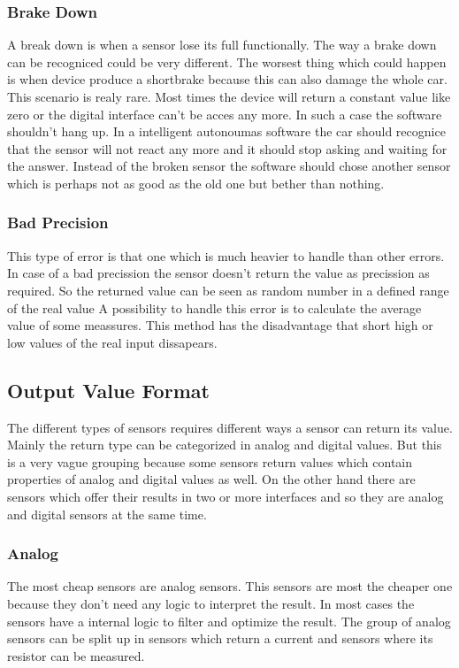 \subsubsection{Brake Down}
A break down is when a sensor lose its full functionally.
The way a brake down can be recogniced could be very different.
The worsest thing which could happen is when device produce a shortbrake because this can also damage the whole car.
This scenario is realy rare.
Most times the device will return a constant value like zero or the digital interface can't be acces any more.
In such a case the software shouldn't hang up.
In a intelligent autonoumas software the car should recognice that the sensor will not react any more and it should stop asking and waiting for the answer.
Instead of the broken sensor the software should chose another sensor which is perhaps not as good as the old one but bether than nothing.


\subsubsection{Bad Precision}
This type of error is that one which is much heavier to handle than other errors.
In case of a bad precission the sensor doesn't return the value as precission as required.
So the returned value can be seen as random number in a defined range of the real value
A possibility to handle this error is to calculate the average value of some meassures.
This method has the disadvantage that short high or low values of the real input dissapears.


\subsection{Output Value Format}
The different types of sensors requires different ways a sensor can return its value.
Mainly the return type can be categorized in analog and digital values.
But this is a very vague grouping because some sensors return values which contain properties of analog and digital values as well.
On the other hand there are sensors which offer their results in two or more interfaces and so they are analog and digital sensors at the same time.


\subsubsection{Analog}
The most cheap sensors are analog sensors.
This sensors are most the cheaper one because they don't need any logic to interpret the result.
In most cases the sensors have a internal logic to filter and optimize the result.
The group of analog sensors can be split up in sensors which return a current and sensors where its resistor can be measured.


